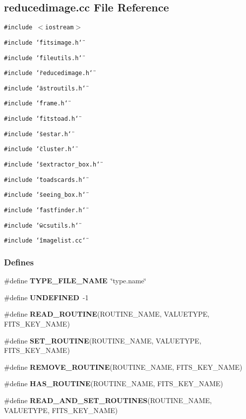 \subsection{reducedimage.cc File Reference}
\label{reducedimage_cc}
{\tt \#include $<$iostream$>$}\par
{\tt \#include \char`\"{}fitsimage.h\char`\"{}}\par
{\tt \#include \char`\"{}fileutils.h\char`\"{}}\par
{\tt \#include \char`\"{}reducedimage.h\char`\"{}}\par
{\tt \#include \char`\"{}astroutils.h\char`\"{}}\par
{\tt \#include \char`\"{}frame.h\char`\"{}}\par
{\tt \#include \char`\"{}fitstoad.h\char`\"{}}\par
{\tt \#include \char`\"{}sestar.h\char`\"{}}\par
{\tt \#include \char`\"{}cluster.h\char`\"{}}\par
{\tt \#include \char`\"{}sextractor\_\-box.h\char`\"{}}\par
{\tt \#include \char`\"{}toadscards.h\char`\"{}}\par
{\tt \#include \char`\"{}seeing\_\-box.h\char`\"{}}\par
{\tt \#include \char`\"{}fastfinder.h\char`\"{}}\par
{\tt \#include \char`\"{}wcsutils.h\char`\"{}}\par
{\tt \#include \char`\"{}imagelist.cc\char`\"{}}\par
\subsubsection*{Defines}
\begin{CompactItemize}
\item 
{}
\#define {\bf TYPE\_\-FILE\_\-NAME}\ \char`\"{}type.name\char`\"{}\label{reducedimage_cc_a0}

\item 
{}
\#define {\bf UNDEFINED}\ -1\label{reducedimage_cc_a1}

\item 
\#define {\bf READ\_\-ROUTINE}(ROUTINE\_\-NAME, VALUETYPE, FITS\_\-KEY\_\-NAME)
\item 
\#define {\bf SET\_\-ROUTINE}(ROUTINE\_\-NAME, VALUETYPE, FITS\_\-KEY\_\-NAME)
\item 
\#define {\bf REMOVE\_\-ROUTINE}(ROUTINE\_\-NAME, FITS\_\-KEY\_\-NAME)
\item 
\#define {\bf HAS\_\-ROUTINE}(ROUTINE\_\-NAME, FITS\_\-KEY\_\-NAME)
\item 
\#define {\bf READ\_\-AND\_\-SET\_\-ROUTINES}(ROUTINE\_\-NAME, VALUETYPE, FITS\_\-KEY\_\-NAME)
\end{CompactItemize}
